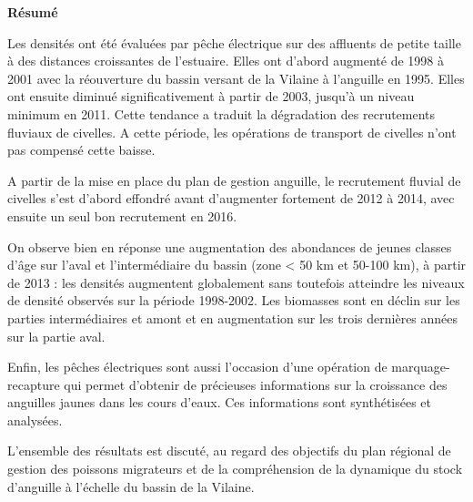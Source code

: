 \documentclass[10pt,twocolumn,titlepage,twoside]{article}\usepackage[]{graphicx}\usepackage[]{color}
\begin{document}
\onecolumn
\thispagestyle{empty}
\pagecolor{bleu_EV}
\begin{tcolorbox}[enhanced jigsaw,
                  colback=turquoise_EV!30,%
                  colframe=turquoise_EV,%
                  width=\textwidth,%
                  arc=3mm, auto outer arc,
                  boxrule=5pt,
                  drop shadow={bleu_EV!50!gray!80}
                 ]
\textbf{Résumé}\par

 \vspace{8mm}
 
 
    Les densités ont été évaluées par pêche électrique  sur des
    affluents de petite taille à des distances croissantes de l'estuaire.     
    Elles ont d'abord augmenté de 1998 à 2001 avec la réouverture du
    bassin versant de la Vilaine à l'anguille en 1995. Elles ont ensuite diminué
    significativement à partir de 2003, jusqu'à un niveau minimum en 2011. Cette tendance a traduit la dégradation des
    recrutements fluviaux de civelles. A cette période, les opérations de
    transport de civelles n'ont pas compensé cette baisse.  
    
    A partir de la mise en place du plan de gestion anguille,  le recrutement
    fluvial de civelles s'est d'abord effondré avant d'augmenter fortement de
    2012 à 2014, avec ensuite un seul bon recrutement en 2016.
    
    On observe bien en réponse une augmentation des abondances de jeunes
    classes d'âge sur l'aval et l'intermédiaire du bassin (zone < 50 km et
    50-100 km), à partir de 2013 :  les densités augmentent globalement sans
    toutefois atteindre les niveaux de densité
    observés sur la période 1998-2002. Les biomasses sont en déclin sur les
    parties intermédiaires et amont et en augmentation 
    sur les trois dernières années sur la partie aval.
    
    Enfin, les pêches électriques sont aussi l'occasion d'une opération de
    marquage-recapture qui permet d'obtenir de précieuses informations sur la
    croissance des anguilles jaunes dans les cours d'eaux. Ces informations sont
    synthétisées et analysées.
    
    L'ensemble des résultats est discuté, au regard des objectifs du plan
    régional de gestion des poissons migrateurs et de la compréhension de la
    dynamique du stock d'anguille à l'échelle du bassin de la Vilaine.\\
        

\end{tcolorbox}
\end{document}
